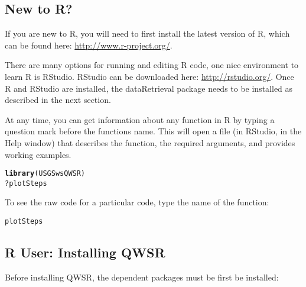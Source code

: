 \documentclass[a4paper,11pt]{article}\usepackage{graphicx, color}
\makeatletter
\newcommand{\hlfunctioncall}[1]{\textcolor[rgb]{0.501960784313725,0,0.329411764705882}{\textbf{#1}}}%
\newenvironment{kframe}{%
 \def\at@end@of@kframe{}%
 \ifinner\ifhmode%
  \def\at@end@of@kframe{\end{minipage}}%
  \begin{minipage}{\columnwidth}%
 \fi\fi%
 \def\FrameCommand##1{\hskip\@totalleftmargin \hskip-\fboxsep
 \colorbox{shadecolor}{##1}\hskip-\fboxsep
     \hskip-\linewidth \hskip-\@totalleftmargin \hskip\columnwidth}%
 \MakeFramed {\advance\hsize-\width
   \@totalleftmargin\z@ \linewidth\hsize
   \@setminipage}}%
 {\par\unskip\endMakeFramed%
 \at@end@of@kframe}
\newenvironment{knitrout}{}{} %
\makeatother
\begin{document}
\subsection{New to R?}
If you are new to R, you will need to first install the latest version of R, which can be found here: \url{http://www.r-project.org/}.

There are many options for running and editing R code, one nice environment to learn R is RStudio. RStudio can be downloaded here: \url{http://rstudio.org/}. Once R and RStudio are installed, the dataRetrieval package needs to be installed as described in the next section.

At any time, you can get information about any function in R by typing a question mark before the functions name.  This will open a file (in RStudio, in the Help window) that describes the function, the required arguments, and provides working examples.

\begin{knitrout}
\color{fgcolor}\begin{kframe}
\begin{alltt}
\hlfunctioncall{library}(USGSwsQWSR)
?plotSteps
\end{alltt}
\end{kframe}
\end{knitrout}


To see the raw code for a particular code, type the name of the function:
\begin{knitrout}
\color{fgcolor}\begin{kframe}
\begin{alltt}
plotSteps
\end{alltt}
\end{kframe}
\end{knitrout}


\subsection{R User: Installing QWSR}
Before installing QWSR, the dependent packages must be first be installed:
\end{document}
